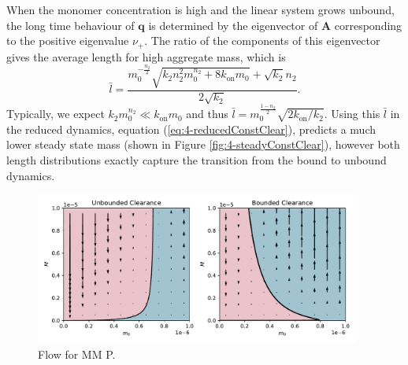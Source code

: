 When the monomer concentration is high and the linear system grows unbound, the long time behaviour of $\mathbf{q}$ is determined by the eigenvector of $\mathbf{A}$ corresponding to the positive eigenvalue $\nu_+$. The ratio of the components of this eigenvector gives the average length for high aggregate mass, which is
\begin{equation}
    \bar{l} = \frac{m_0^{-\frac{n_2}{2}} \sqrt{k_2 n_2^2 m_0^{n_2}+8 k_\text{on} m_0}+\sqrt{k_2} n_2}{2 \sqrt{k_2}}.
    \label{eq:4-lbar-growth}
\end{equation}
Typically, we expect $k_2 m_0^{n_2} \ll k_\text{on} m_0$ and thus $\bar{l} = m_0^{\frac{1-n_2}{2}}\sqrt{2 k_\text{on}/k_2}$. Using this $\bar{l}$ in the reduced dynamics, equation (\ref{eq:4-reducedConstClear}), predicts a much lower steady state mass (shown in Figure \ref{fig:4-steadyConstClear}), however both length distributions exactly capture the transition from the bound to unbound dynamics.
\begin{figure}
    \centering
    \includegraphics[width=0.95\textwidth]{figures/4-agg-figs/reduced_nocol.pdf}
    \caption{Flow for MM P.}
    \label{fig:4-flowMM_P}
\end{figure}


